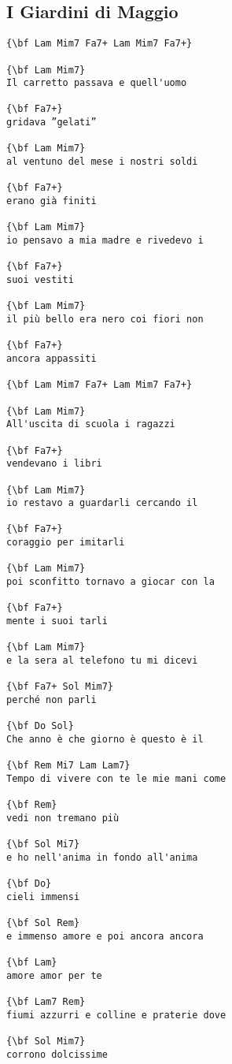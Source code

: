 \documentclass[a4paper]{article}
\begin{document}
\subsection{I Giardini di Maggio} %
\label{sub:I Giardini di Maggio}
\begin{multicols}{2}
\begin{Verbatim}[commandchars=\\\{\}]
{\bf Lam Mim7 Fa7+ Lam Mim7 Fa7+}

{\bf Lam Mim7}
Il carretto passava e quell'uomo

{\bf Fa7+}
gridava ”gelati”

{\bf Lam Mim7}
al ventuno del mese i nostri soldi

{\bf Fa7+}
erano già finiti

{\bf Lam Mim7}
io pensavo a mia madre e rivedevo i

{\bf Fa7+}
suoi vestiti

{\bf Lam Mim7}
il più bello era nero coi fiori non

{\bf Fa7+}
ancora appassiti

{\bf Lam Mim7 Fa7+ Lam Mim7 Fa7+}

{\bf Lam Mim7}
All'uscita di scuola i ragazzi

{\bf Fa7+}
vendevano i libri

{\bf Lam Mim7}
io restavo a guardarli cercando il

{\bf Fa7+}
coraggio per imitarli

{\bf Lam Mim7}
poi sconfitto tornavo a giocar con la

{\bf Fa7+}
mente i suoi tarli

{\bf Lam Mim7}
e la sera al telefono tu mi dicevi

{\bf Fa7+ Sol Mim7}
perché non parli

{\bf Do Sol}
Che anno è che giorno è questo è il

{\bf Rem Mi7 Lam Lam7}
Tempo di vivere con te le mie mani come

{\bf Rem}
vedi non tremano più

{\bf Sol Mi7}
e ho nell'anima in fondo all'anima

{\bf Do}
cieli immensi

{\bf Sol Rem}
e immenso amore e poi ancora ancora

{\bf Lam}
amore amor per te

{\bf Lam7 Rem}
fiumi azzurri e colline e praterie dove

{\bf Sol Mim7}
corrono dolcissime


\end{Verbatim}
\end{multicols}
\end{document}
